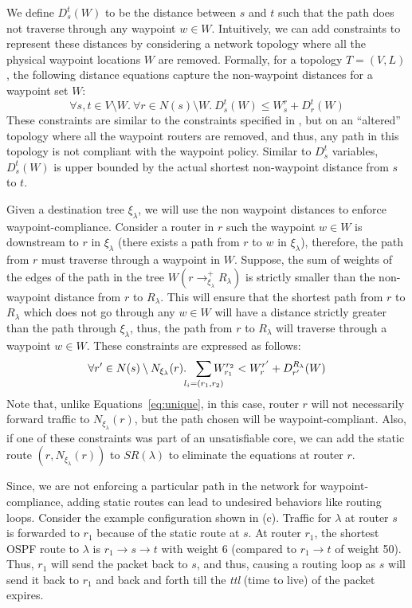 We define $D_s^t(W)$ to be the 
distance between $s$ and $t$ such that the path does not
 traverse through any waypoint $w \in W$. Intuitively, we
  can add constraints to represent these distances by
  considering a network topology where all the physical 
  waypoint locations $W$ are removed. Formally, for a topology 
 $T = (V,L)$, the following distance equations 
 capture the non-waypoint distances 
 for a waypoint set $W$:
\begin{equation} \label{eq:wdistance}
\forall s, t \in V \setminus W. ~\forall r \in N(s) \setminus W.~
D_s^t(W) \leq W_s^r + D_r^t(W)
\end{equation}
These constraints are similar to the constraints specified in
, but on an ``altered'' topology where all
the waypoint routers are removed, and thus, any path in this 
topology is not compliant with the waypoint policy. 
Similar to $D_s^t$ variables, 
$D_s^t(W)$ is upper bounded by the actual shortest non-waypoint distance from $s$ to $t$.

Given a destination tree $\xi_\lambda$, we will use the non
waypoint distances to enforce waypoint-compliance. Consider a 
router in $r$ such the waypoint $w \in W$ is downstream to $r$ in $\xi_\lambda$
(there exists a path from $r$ to $w$ in $\xi_\lambda$), therefore,
the path from $r$ must traverse through 
a waypoint in $W$.  
Suppose, the sum of weights of the edges of
the path in the tree $W(r \rightarrow^+_{\xi_\lambda} R_\lambda)$  
is strictly smaller than the non-waypoint 
distance from $r$ to $R_\lambda$. This will ensure that 
the shortest path from $r$ to $R_\lambda$ which does not go through
any $w \in W$ will have a distance strictly greater than the path through
$\xi_\lambda$, thus, the path from $r$ to $R_\lambda$ will traverse
through a waypoint $w \in W$. These constraints are expressed as follows:
\begin{equation} \label{eq:waypoint}
\forall r' \in N(s) \setminus N_{\xi_\lambda}(r).~~ \sum_{\mathclap{\substack{l_i=(r_1,r_2)}}} 
W_{r_1}^{r_2} < 
W_{r}^{r'}+ D_{r'}^{R_\lambda}(W) 
\end{equation}
Note that, unlike Equations~\ref{eq:unique}, in this case, 
router $r$ will not necessarily forward traffic to  
$N_{\xi_\lambda}(r)$, but the path chosen will be waypoint-compliant. 
Also, if one of these constraints was part of an unsatisfiable  
core, we can add the static route $(r, N_{\xi_\lambda}(r))$ to
$SR(\lambda)$ to eliminate the equations at router $r$. 

 \label{sec:loopavoidance}
Since, we are not enforcing a particular path in the network for waypoint-
compliance, adding
static routes can lead to undesired behaviors like routing loops.  
Consider the example configuration shown in (c). 
Traffic for $\lambda$ at router $s$ is forwarded to $r_1$ because of the
static route at $s$. At router $r_1$, the shortest OSPF route to
$\lambda$ is $r_1 \rightarrow s \rightarrow t$ with weight 6 (compared 
to $r_1 \rightarrow t$ of weight 50). Thus, $r_1$ will send the 
packet back to $s$, and thus, causing a routing loop as $s$ will send
it back to $r_1$ and back and forth till the \emph{ttl} (time to live) of the
packet expires. 

